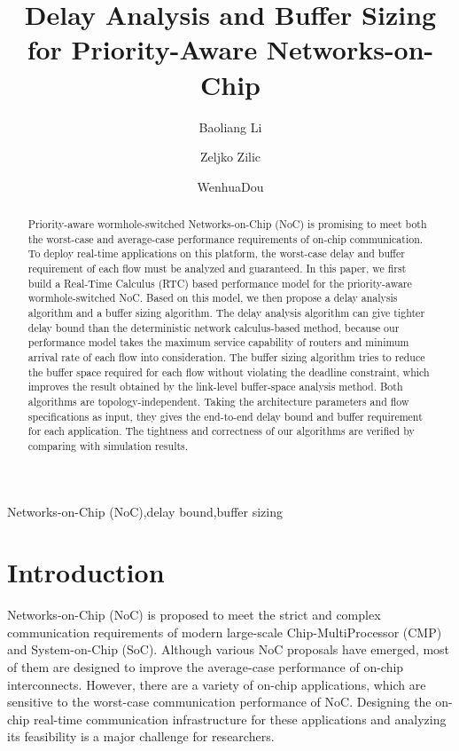 \documentclass[preprint]{elsarticle}
\begin{document}
\begin{frontmatter}

\title{Delay Analysis and Buffer Sizing for Priority-Aware Networks-on-Chip}

\author[nudt]{Baoliang Li}
\author[mcgill]{Zeljko Zilic}
\author[nudt]{WenhuaDou}
\address[nudt]{College of Computer, National University of Defense Technology, Changsha 410073, Hu'nan, China}
\address[mcgill]{Department of Electrical $\&$ Computer Engineering, McGill University, Montreal H3A-2A7, Quebec, Canada}

\begin{abstract}
Priority-aware wormhole-switched Networks-on-Chip (NoC) is promising to meet both the worst-case and average-case performance requirements of on-chip communication. To deploy real-time applications on this platform, the worst-case delay and buffer requirement of each flow must be analyzed and guaranteed. In this paper, we first build a Real-Time Calculus (RTC) based performance model for the priority-aware wormhole-switched NoC. Based on this model, we then propose a delay analysis algorithm and a buffer sizing algorithm. The delay analysis algorithm can give tighter delay bound than the deterministic network calculus-based method, because our performance model takes the maximum service capability of routers and minimum arrival rate of each flow into consideration. The buffer sizing algorithm tries to reduce the buffer space required for each flow without violating the deadline constraint, which improves the result obtained by the link-level buffer-space analysis method. Both algorithms are topology-independent. Taking the architecture parameters and flow specifications as input, they gives the end-to-end delay bound and buffer requirement for each application. The tightness and correctness of our algorithms are verified by comparing with simulation results.
\end{abstract}

\begin{keyword}
Networks-on-Chip (NoC)\sep delay bound\sep buffer sizing
\end{keyword}

\end{frontmatter}

\linenumbers

\section{Introduction}
Networks-on-Chip (NoC) is proposed to meet the strict and complex communication requirements of modern large-scale Chip-MultiProcessor (CMP) and System-on-Chip (SoC). Although various NoC proposals have emerged, most of them are designed to improve the average-case performance of on-chip interconnects. However, there are a variety of on-chip applications, which are sensitive to the worst-case communication performance of NoC. Designing the on-chip real-time communication infrastructure for these applications and analyzing its feasibility is a major challenge for researchers.
\end{document}
